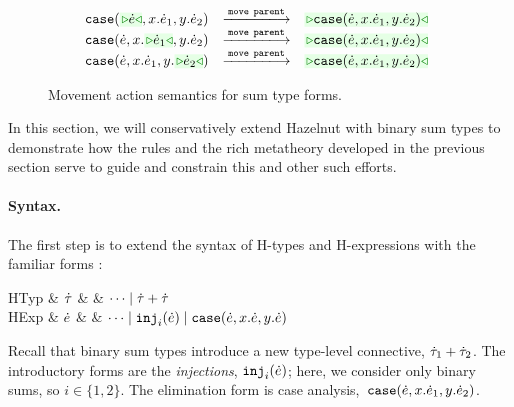 \begin{figure}
\begin{displaymath}
\begin{array}{@{}rcl}
  \\
  \TABperformMove
      {      {\hcase{\zwsel{\hexp}}{x}{\hexp_1}{y}{\hexp_2}}}
      {\aMove{\dParent}}
      {\zwsel{\hcase{{\hexp}}{x}{\hexp_1}{y}{\hexp_2}}}
  \\
  \TABperformMove
      {      {\hcase{{\hexp}}{x}{\zwsel{\hexp_1}}{y}{\hexp_2}}}
      {\aMove{\dParent}}
      {\zwsel{\hcase{{\hexp}}{x}{\hexp_1}{y}{\hexp_2}}}
  \\
  \TABperformMove
      {      {\hcase{{\hexp}}{x}{\hexp_1}{y}{\zwsel{\hexp_2}}}}
      {\aMove{\dParent}}
      {\zwsel{\hcase{{\hexp}}{x}{\hexp_1}{y}{\hexp_2}}}
\end{array}
\end{displaymath}
\caption{Movement action semantics for sum type forms.}
\label{fig:sum-move}
\end{figure}


In this section, we will conservatively extend Hazelnut with binary {sum types} to demonstrate how the rules and the rich metatheory developed in the previous section serve to guide and constrain this and other such efforts. 

\paragraph{Syntax.} 
%
The first step is to extend the syntax of H-types and H-expressions 
with the familiar forms \cite{pfpl}:
\begin{grammar}
\textsf{HTyp} & $\dot{\tau}$ & \bnfas & $\cdots \mathrel{\mid} {\dot{\tau}} + {\dot{\tau}}$
\\
\textsf{HExp} & $\dot{e}$ & \bnfas & $\cdots 
\mathrel{\mid} \texttt{inj}_{i}({\dot{e}})
\mathrel{\mid} \texttt{case}({\dot{e}},{x}.{\dot{e}},{y}.{\dot{e}})$
\end{grammar}
Recall that binary sum types introduce a new type-level connective, $\dot{\tau}_1 + \dot{\tau}_2$. The introductory forms are the \emph{injections}, $\texttt{inj}_{i}({\dot{e}})$; 
here, we consider only binary sums, so $i\in\{1,2\}$. 
The elimination form is case
analysis,~$\texttt{case}({\dot{e}},{x}.{\dot{e}_1},{y}.{\dot{e}_2})$.

